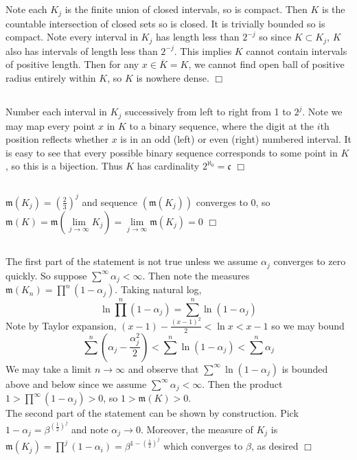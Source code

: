 \documentclass{article}
\begin{document}
\subsection{}
Note each $K_j$ is the finite union of closed intervals, so is compact. Then $K$ is the countable intersection of closed sets so is closed. It is trivially bounded so is compact. Note every interval in $K_j$ has length less than $2^{-j}$ so since $K \subset K_j$, $K$ also has intervals of length less than $2^{-j}$. This implies $K$ cannot contain intervals of positive length. Then for any $x \in \overline{K} = K$, we cannot find open ball of positive radius entirely within $K$, so $K$ is nowhere dense. $\Box$
\subsection{}
Number each interval in $K_j$ successively from left to right from 1 to $2^j$. Note we may map every point $x$ in $K$ to a binary sequence, where the digit at the $i$th position reflects whether $x$ is in an odd (left) or even (right) numbered interval. It is easy to see that every possible binary sequence corresponds to some point in $K$, so this is a bijection. Thus $K$ has cardinality $2^{\aleph_0} = \mathfrak{c}$ $\Box$
\subsection{}
$\mathfrak{m}(K_j) = \left(\frac{2}{3}\right)^j$ and sequence $(\mathfrak{m}(K_j))$ converges to 0, so $\mathfrak{m}(K) = \mathfrak{m}\left(\lim\limits_{j\rightarrow\infty} K_j\right) = \lim\limits_{j\rightarrow\infty} \mathfrak{m}(K_j) = 0$ $\Box$
\subsection{}
The first part of the statement is not true unless we assume $\alpha_j$ converges to zero quickly. So suppose $\sum\limits^\infty \alpha_j < \infty$. Then note the measures $\mathfrak{m}(K_n) = \prod\limits^n (1-\alpha_j)$. Taking natural log,
$$\ln \prod\limits^n (1-\alpha_j) = \sum\limits^n \ln(1-\alpha_j)$$
Note by Taylor expansion, $(x-1) - \frac{(x-1)^2}{2} < \ln x < x -1$ so we may bound
$$\sum\limits^n \left(\alpha_j - \frac{\alpha_j^2}{2}\right) < \sum\limits^n \ln(1-\alpha_j) < \sum\limits^n \alpha_j$$
We may take a limit $n\rightarrow \infty$ and observe that $\sum\limits^\infty \ln(1-\alpha_j)$ is bounded above and below since we assume $\sum\limits^\infty \alpha_j < \infty$. Then the product $1 > \prod\limits^\infty (1-\alpha_j) > 0$, so $1 > \mathfrak{m}(K) > 0$.\\
The second part of the statement can be shown by construction. Pick $1-\alpha_j = \beta^{\left(\frac{1}{2}\right)^j}$ and note $\alpha_j \rightarrow 0$. Moreover, the measure of $K_j$ is $\mathfrak{m}(K_j) = \prod\limits^j (1-\alpha_i) = \beta^{1- \left(\frac{1}{2}\right)^j}$ which converges to $\beta$, as desired $\Box$
\end{document}
